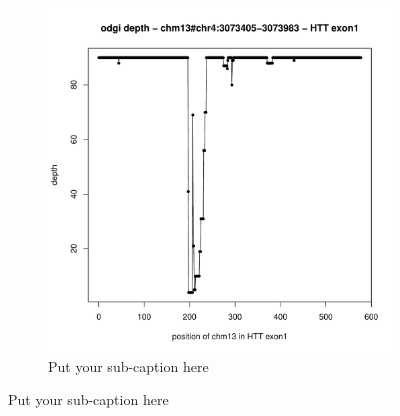 \begin{figure}[h!]
\begin{subfigure}{.5\linewidth}
	\includegraphics[width=1.0\linewidth]{fig/metrics/chr4.HTT.chm13.depth.w1.bed.pdf}  
	\caption{Put your sub-caption here}
	\label{fig:sub-sixth}
	\end{subfigure}


\end{figure}
